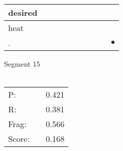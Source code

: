\documentclass[landscape]{article}
\newcommand{\ssp}{\hspace{2pt}}
\newcommand{\mex}{\cellcolor{g}$\bullet$}
\begin{document}
\begin{tabular}{|l|p{10pt}|p{10pt}|p{10pt}|p{10pt}|p{10pt}|p{10pt}|p{10pt}|p{10pt}|p{10pt}|}
\hline
\ssp desired \ssp&\hspace{2pt}&\hspace{2pt}&\hspace{2pt}&\hspace{2pt}&\hspace{2pt}&\hspace{2pt}&\hspace{2pt}&\hspace{2pt}&\hspace{2pt}\\
\hline
\ssp heat \ssp&\hspace{2pt}&\hspace{2pt}&\hspace{2pt}&\hspace{2pt}&\hspace{2pt}&\hspace{2pt}&\hspace{2pt}&\hspace{2pt}&\hspace{2pt}\\
\hline
\ssp \cellcolor{ref8}. \ssp&\hspace{2pt}&\hspace{2pt}&\hspace{2pt}&\hspace{2pt}&\hspace{2pt}&\hspace{2pt}&\hspace{2pt}&\hspace{2pt}&\hspace{2pt}\mex\\
\hline
\end{tabular}

\vspace{6pt}
\noindent Segment 15\\\\
\noindent\begin{tabular}{lm{12pt}r}
\hline
P:&&0.421\\
R:&&0.381\\
Frag:&&0.566\\
Score:&&0.168\\
\end{tabular}

\newpage
\end{document}
